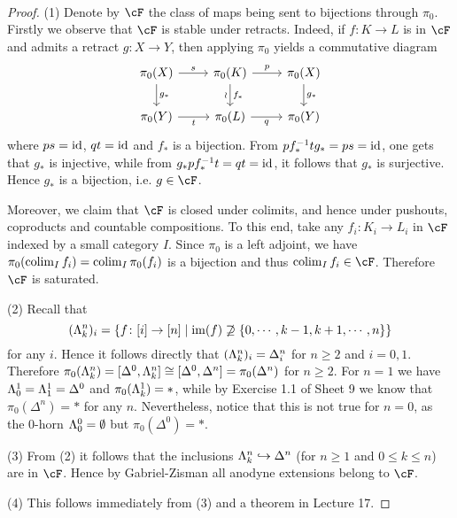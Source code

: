 \documentclass[a4paper,11pt,openany]{scrartcl}
\begin{document}
~\\
\begin{proof}
(1) Denote by $\cF$ the class of maps being sent to bijections through $\pi_0$. Firstly we observe that $\cF$ is stable under retracts. Indeed, if $f\colon K\to L$ is in $\cF$ and admits a retract $g\colon X\to Y$, then applying $\pi_0$ yields a commutative diagram
\[
\begin{tikzcd}
\pi_0(X)\arrow[r,"s"]\arrow[d,"g_*"]& \pi_0(K)\arrow[d,"f_*", "\wr"']\arrow[r,"p"]& \pi_0(X)\arrow[d,"g_*"]\\
\pi_0(Y)\arrow[r,"t"']& \pi_0(L)\arrow[r,"q"']& \pi_0(Y)
\end{tikzcd}
\]
where $ps=\operatorname{id}$, $qt=\operatorname{id}$ and $f_*$ is a bijection. From $pf_*^{-1}tg_*=ps=\operatorname{id}$, one gets that $g_*$ is injective, while from $g_*pf_*^{-1}t=qt=\operatorname{id}$, it follows that $g_*$ is surjective. Hence $g_*$ is a bijection, i.e. $g\in\cF$. 

Moreover, we claim that $\cF$ is closed under colimits, and hence under pushouts, coproducts and countable compositions. To this end, take any $f_i\colon K_i\to L_i$ in $\cF$ indexed by a small category $I$. Since $\pi_0$ is a left adjoint, we have $\pi_0(\operatorname{colim}_If_i)=\operatorname{colim}_I\pi_0(f_i)$ is a bijection and thus $\colim_If_i\in\cF$. Therefore $\cF$ is saturated.

(2) Recall that
\[
(\Lambda^n_k)_i=\{f\colon[i]\to[n]\mid\operatorname{im}(f)\not\supseteq\{0,\cdots,k-1,k+1,\cdots,n\}\}
\]
for any $i$. Hence it follows directly that $(\Lambda^n_k)_i=\Delta^n_i$ for $n\geqslant2$ and $i=0,1$. Therefore $\pi_0(\Lambda^n_k)=[\Delta^0,\Lambda^n_k]\cong[\Delta^0,\Delta^n]=\pi_0(\Delta^n)$ for $n\geqslant2$. For $n=1$ we have $\Lambda^1_0=\Lambda^1_1=\Delta^0$ and $\pi_0(\Lambda^1_k)=*$, while by Exercise 1.1 of Sheet 9 we know that $\pi_0(\Delta^n)=*$ for any $n$. Nevertheless, notice that this is not true for $n=0$, as the $0$-horn $\Lambda^0_0=\emptyset$ but $\pi_0(\Delta^0)=*$.

(3) From (2) it follows that the inclusions $\Lambda^n_k\hookrightarrow\Delta^n$ (for $n\geqslant1$ and $0\leqslant k\leqslant n$) are in $\cF$. Hence by Gabriel-Zisman all anodyne extensions belong to $\cF$.

(4) This follows immediately from (3) and a theorem in Lecture 17.


\end{proof}
\end{document}
